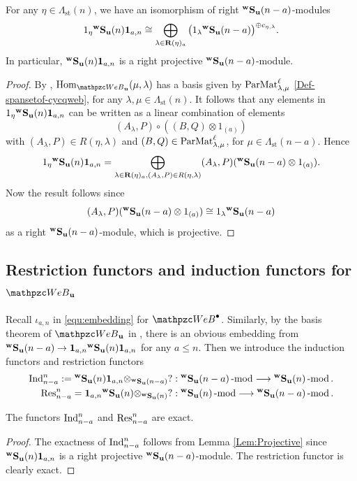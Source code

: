 \begin{lemma}
\label{Lem:Projective}
For any $ \eta\in \Lambda_{\text{st}}(n)$, we have an isomorphism of right ${}^{\bold{w}}\bold{S}_{\mathbf{u}}(n-a)$-modules
\[
1_\eta {}^{\bold{w}}\bold{S}_{\mathbf{u}}(n)\mathbf {1}_{a,n}\cong \bigoplus_{\lambda\in \mathbf R(\eta)_a} \big(1_\lambda {}^{\bold{w}}\bold{S}_{\mathbf{u}}(n-a)\big)^{\oplus c_{\eta,\lambda}}. 
\]
In particular, ${}^{\bold{w}}\bold{S}_{\mathbf{u}}(n)\mathbf {1}_{a,n}$ is a right projective    ${}^{\bold{w}}\bold{S}_{\mathbf{u}}(n-a)$-module.  
\end{lemma}  

\begin{proof}
  By \cite[Theorem 5.17]{SSW25},  $\Hom_{\qW_{\bfu}}(\mu,\lambda)$ has a basis given by $\text{ParMat}_{\lambda,\mu}^\ell$ \eqref{Def-spansetof-cycqweb}, for any $\lambda,\mu \in\Lambda_{\text{st}}(n)$. It follows that 
     any elements in $1_\eta {}^{\bold{w}}\bold{S}_{\mathbf{u}}(n)\mathbf{1}_{a,n}$ can be written as a linear combination of elements 
     \[ 
     (A_\lambda, P)\circ ((B,Q)\otimes 1_{(a)}) 
     \]
     with $ (A_\lambda, P)\in R(\eta,\lambda)  $ and $(B,Q)\in \text{ParMat}_{\lambda,\mu}^\ell $, for $\mu \in \Lambda_{\text{st}}(n-a)$.
     Hence 
     \[
     1_\eta {}^{\bold{w}}\bold{S}_{\mathbf{u}}(n)\mathbf{1}_{a,n}=\bigoplus_{\lambda\in \mathbf R(\eta)_a, (A_\lambda, P)\in R(\eta,\lambda) } (A_\lambda, P)({}^{\bold{w}}\bold{S}_{\mathbf{u}}(n-a)\otimes 1_{(a)}).
     \]
     Now the result follows since 
     \[ (A_\lambda, P)({}^{\bold{w}}\bold{S}_{\mathbf{u}}(n-a)\otimes 1_{(a)})  \cong 1_\lambda {}^{\bold{w}}\bold{S}_{\mathbf{u}}(n-a) \]
     as a right ${}^{\bold{w}}\bold{S}_{\mathbf{u}}(n-a)$-module, which is projective. 
 \end{proof}



\subsection{Restriction functors and induction functors for $\qW_\bfu$}

Recall $\iota_{a,n}$  in \eqref{equ:embedding} for $\qAW$. Similarly, by the basis theorem of $\qW_\bfu$ in \cite[Theorem 5.17]{SSW25},  there is an obvious embedding from ${}^{\bold{w}}\bold{S}_{\mathbf{u}}(n-a) \rightarrow \mathbf{1}_{a,n}{}^{\bold{w}}\bold{S}_{\mathbf{u}}(n)\mathbf{1}_{a,n}$ for any $a\le n$. Then   
we introduce the induction functors and restriction functors 
\begin{align}  \label{eq:IndRes}
\begin{split}
\operatorname{Ind}\nolimits_{n-a}^{n}:= {}^{\bold{w}}\bold{S}_{\mathbf{u}}(n)\mathbf{1}_{a,n}\otimes _{{}^{\bold{w}}\bold{S}_{\mathbf{u}}(n-a)} ? & : {}^{\bold{w}}\bold{S}_{\mathbf{u}}(n-a)\operatorname{-mod}\nolimits \longrightarrow {}^{\bold{w}}\bold{S}_{\mathbf{u}}(n)\operatorname{-mod}\nolimits. 
\\
\text{Res}^{n}_{n-a}=\mathbf{1}_{a,n}{}^{\bold{w}}\bold{S}_{\mathbf{u}}(n)\otimes _{{}^{\bold{w}}\bold{S}_{\mathbf{u}}(n)}? &: {}^{\bold{w}}\bold{S}_{\mathbf{u}}(n)\operatorname{-mod}\nolimits\longrightarrow {}^{\bold{w}}\bold{S}_{\mathbf{u}}(n-a)\operatorname{-mod}\nolimits.
\end{split}
\end{align}

\begin{lemma}
 The functors $\operatorname{Ind}\nolimits^n_{n-a}$ and $\operatorname{Res}\nolimits^{n}_{n-a}$ are exact.
\end{lemma}

\begin{proof}
  The exactness of $\operatorname{Ind}\nolimits^n_{n-a}$ follows from Lemma  \ref{Lem:Projective} since    ${}^{\bold{w}}\bold{S}_{\mathbf{u}}(n)\mathbf{1}_{a,n}$ is a right projective ${}^{\bold{w}}\bold{S}_{\mathbf{u}}(n-a)$-module. The restriction functor is clearly exact.
\end{proof}
